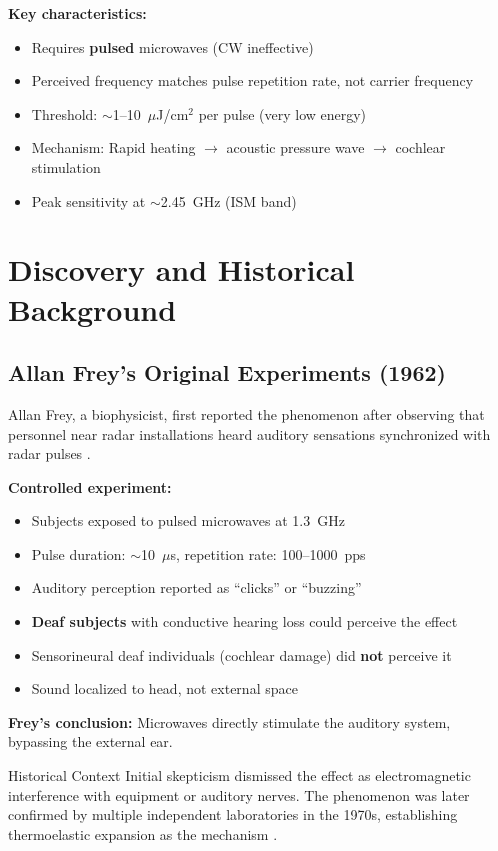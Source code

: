 \textbf{Key characteristics:}
\begin{itemize}
\item Requires \textbf{pulsed} microwaves (CW ineffective)
\item Perceived frequency matches pulse repetition rate, not carrier frequency
\item Threshold: $\sim$1--10~$\mu$J/cm$^2$ per pulse (very low energy)
\item Mechanism: Rapid heating $\rightarrow$ acoustic pressure wave $\rightarrow$ cochlear stimulation
\item Peak sensitivity at $\sim$2.45~GHz (ISM band)
\end{itemize}

\section{Discovery and Historical Background}

\subsection{Allan Frey's Original Experiments (1962)}

Allan Frey, a biophysicist, first reported the phenomenon after observing that personnel near radar installations heard auditory sensations synchronized with radar pulses \cite{Frey1962}.

\textbf{Controlled experiment:}
\begin{itemize}
\item Subjects exposed to pulsed microwaves at 1.3~GHz
\item Pulse duration: $\sim$10~$\mu$s, repetition rate: 100--1000~pps
\item Auditory perception reported as ``clicks'' or ``buzzing''
\item \textbf{Deaf subjects} with conductive hearing loss could perceive the effect
\item Sensorineural deaf individuals (cochlear damage) did \textbf{not} perceive it
\item Sound localized to head, not external space
\end{itemize}

\textbf{Frey's conclusion:} Microwaves directly stimulate the auditory system, bypassing the external ear.

\begin{calloutbox}{Historical Context}
Initial skepticism dismissed the effect as electromagnetic interference with equipment or auditory nerves. The phenomenon was later confirmed by multiple independent laboratories in the 1970s, establishing thermoelastic expansion as the mechanism \cite{Lin1980, Foster1974}.
\end{calloutbox}

